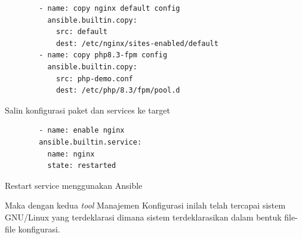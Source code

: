 \documentclass[10pt,]{report}
\newenvironment{code}{\captionsetup{type=listing}}{\vspace{3mm}}
\begin{document}
\begin{adjustwidth}{20pt}{}
\begin{adjustwidth}{20pt}{}
		\begin{code}
			\begin{verbatim}
        - name: copy nginx default config
          ansible.builtin.copy:
            src: default
            dest: /etc/nginx/sites-enabled/default
        - name: copy php8.3-fpm config
          ansible.builtin.copy:
            src: php-demo.conf
            dest: /etc/php/8.3/fpm/pool.d
      \end{verbatim}
			\caption{Salin konfigurasi paket dan services ke target}
		\end{code}

		\begin{code}
			\begin{verbatim}
        - name: enable nginx
        ansible.builtin.service:
          name: nginx
          state: restarted
      \end{verbatim}
			\caption{Restart service menggunakan Ansible}
		\end{code}

		Maka dengan kedua \textit{tool} Manajemen Konfigurasi inilah telah tercapai sistem
		GNU/Linux yang terdeklarasi dimana sistem terdeklarasikan dalam bentuk
		file-file konfigurasi.
	\end{adjustwidth}
\end{adjustwidth}
\newpage
\end{document}
